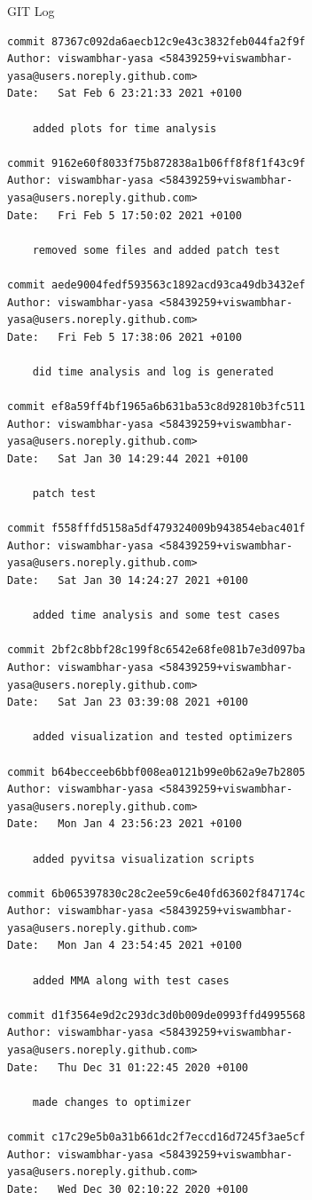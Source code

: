 \documentclass[a4paper,12pt,times]{article}
\begin{document}
\begin{section}{GIT Log}
\begin{verbatim}
commit 87367c092da6aecb12c9e43c3832feb044fa2f9f
Author: viswambhar-yasa <58439259+viswambhar-yasa@users.noreply.github.com>
Date:   Sat Feb 6 23:21:33 2021 +0100

    added plots for time analysis

commit 9162e60f8033f75b872838a1b06ff8f8f1f43c9f
Author: viswambhar-yasa <58439259+viswambhar-yasa@users.noreply.github.com>
Date:   Fri Feb 5 17:50:02 2021 +0100

    removed some files and added patch test

commit aede9004fedf593563c1892acd93ca49db3432ef
Author: viswambhar-yasa <58439259+viswambhar-yasa@users.noreply.github.com>
Date:   Fri Feb 5 17:38:06 2021 +0100

    did time analysis and log is generated

commit ef8a59ff4bf1965a6b631ba53c8d92810b3fc511
Author: viswambhar-yasa <58439259+viswambhar-yasa@users.noreply.github.com>
Date:   Sat Jan 30 14:29:44 2021 +0100

    patch test

commit f558fffd5158a5df479324009b943854ebac401f
Author: viswambhar-yasa <58439259+viswambhar-yasa@users.noreply.github.com>
Date:   Sat Jan 30 14:24:27 2021 +0100

    added time analysis and some test cases

commit 2bf2c8bbf28c199f8c6542e68fe081b7e3d097ba
Author: viswambhar-yasa <58439259+viswambhar-yasa@users.noreply.github.com>
Date:   Sat Jan 23 03:39:08 2021 +0100

    added visualization and tested optimizers

commit b64becceeb6bbf008ea0121b99e0b62a9e7b2805
Author: viswambhar-yasa <58439259+viswambhar-yasa@users.noreply.github.com>
Date:   Mon Jan 4 23:56:23 2021 +0100

    added pyvitsa visualization scripts

commit 6b065397830c28c2ee59c6e40fd63602f847174c
Author: viswambhar-yasa <58439259+viswambhar-yasa@users.noreply.github.com>
Date:   Mon Jan 4 23:54:45 2021 +0100

    added MMA along with test cases

commit d1f3564e9d2c293dc3d0b009de0993ffd4995568
Author: viswambhar-yasa <58439259+viswambhar-yasa@users.noreply.github.com>
Date:   Thu Dec 31 01:22:45 2020 +0100

    made changes to optimizer

commit c17c29e5b0a31b661dc2f7eccd16d7245f3ae5cf
Author: viswambhar-yasa <58439259+viswambhar-yasa@users.noreply.github.com>
Date:   Wed Dec 30 02:10:22 2020 +0100


\end{verbatim}
\end{section}
\end{document}
